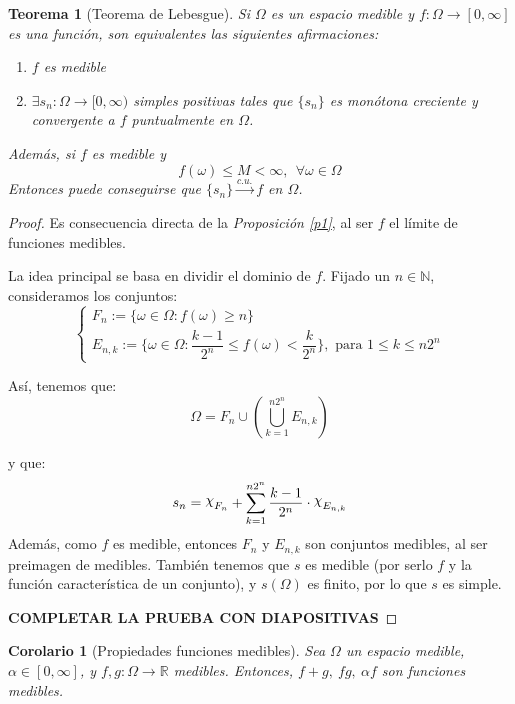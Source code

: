 \documentclass[11pt, a4paper]{article}
\DeclareRobustCommand{\rchi}{{\mathpalette\irchi\relax}}
\newcommand{\irchi}[2]{\raisebox{\depth}{$#1\chi$}} %
\theoremstyle{theorem-style}
\newtheorem{nth}{Teorema}[section]
\newtheorem{ncor}{Corolario}[section]
\theoremstyle{definition-style}
\theoremstyle{remark-style}
\theoremstyle{example-style}
\newenvironment{nlist}
{\begin{enumerate}
\renewcommand\labelenumi{(\emph{\roman{enumi})}}}
{\end{enumerate}}
\begin{document}
\begin{nth}[Teorema de Lebesgue]
	Si $\Omega$ es un espacio medible y $f:\Omega \to [0,\infty]$ es una función, son equivalentes las siguientes afirmaciones:
	\begin{nlist}
	\item $f$ es medible
	\item $\exists s_n : \Omega \to [0,\infty)$ simples positivas tales que $\{s_n\}$ es monótona creciente y convergente a $f$ puntualmente en $\Omega$.
\end{nlist}
Además, si $f$ es medible y
\[
f(\omega) \leq M < \infty, \ \ \forall \omega \in \Omega
\]
Entonces puede conseguirse que $\{s_n\}\xrightarrow{c.u.}f$ en $\Omega$.
\end{nth}
\begin{proof}\hfill

	 Es consecuencia directa de la \textit{Proposición \ref{p1}}, al ser $f$ el límite de funciones medibles.
	 
	 La idea principal se basa en dividir el dominio de $f$. Fijado un $n \in \mathbb{N}$, consideramos los conjuntos: 
	\[
	\begin{cases}
	F_n := \{\omega \in \Omega : f(\omega) \geq n\}\\
	E_{n,k} := \{\omega \in \Omega : \dfrac{k-1}{2^n} \leq f(\omega) < \dfrac{k}{2^n}\}, \text{ para } 1 \leq k \leq n2^n
\end{cases}
	\]
	
    Así, tenemos que:
	\[
	\Omega = F_n \cup \left( \bigcup_{k=1}^{n2^n}E_{n,k} \right)
	\]
	
	y que:
	\[
	s_n = \rchi_{F_n} + \sum_{k=1}^{n2^n}\dfrac{k-1}{2^n}\cdot \rchi_{E_{n,k}}
	\]
    Además, como $f$ es medible, entonces $F_n$ y $E_{n,k}$ son conjuntos medibles, al ser preimagen de medibles. También tenemos que $s$ es medible (por serlo $f$ y la función característica de un conjunto), y $s(\Omega)$ es finito, por lo que $s$ es simple.
    
    \textbf{COMPLETAR LA PRUEBA CON DIAPOSITIVAS}
\end{proof}

\begin{ncor}[Propiedades funciones medibles] Sea $\Omega$ un espacio medible, \mbox{$\alpha \in [0,\infty]$}, y $f,g : \Omega \to \mathbb{R}$ medibles. Entonces, $f + g, \ fg, \ \alpha f$ son funciones medibles.

	
\end{ncor}
\end{document}
